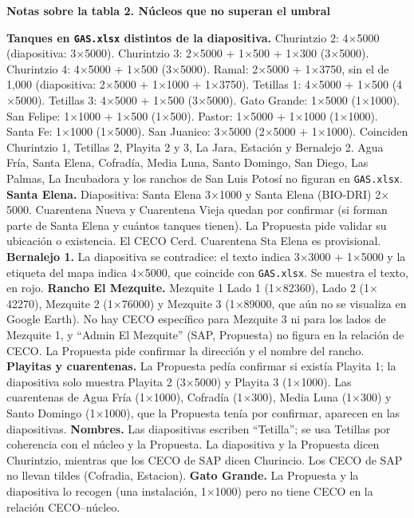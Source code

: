 \documentclass[10pt]{article}
\newcommand{\x}{$\times$}
\begin{document}
\clearpage
\thispagestyle{empty}
\textbf{Notas sobre la tabla 2. Núcleos que no superan el umbral}
\begin{lnotas}
 \textbf{Tanques en \texttt{GAS.xlsx} distintos de la diapositiva.} Churintzio 2: 4\x5000 (diapositiva: 3\x5000). Churintzio 3: 2\x5000 + 1\x500 + 1\x300 (3\x5000). Churintzio 4: 4\x5000 + 1\x500 (3\x5000). Ramal: 2\x5000 + 1\x3750, sin el de 1,000 (diapositiva: 2\x5000 + 1\x1000 + 1\x3750). Tetillas 1: 4\x5000 + 1\x500 (4\x5000). Tetillas 3: 4\x5000 + 1\x500 (3\x5000). Gato Grande: 1\x5000 (1\x1000). San Felipe: 1\x1000 + 1\x500 (1\x500). Pastor: 1\x5000 + 1\x1000 (1\x1000). Santa Fe: 1\x1000 (1\x5000). San Juanico: 3\x5000 (2\x5000 + 1\x1000). Coinciden Churintzio 1, Tetillas 2, Playita 2 y 3, La Jara, Estación y Bernalejo 2. Agua Fría, Santa Elena, Cofradía, Media Luna, Santo Domingo, San Diego, Las Palmas, La Incubadora y los ranchos de San Luis Potosí no figuran en \texttt{GAS.xlsx}.
 \textbf{Santa Elena.} Diapositiva: Santa Elena 3\x1000 y Santa Elena (BIO-DRI) 2\x5000. Cuarentena Nueva y Cuarentena Vieja quedan por confirmar (si forman parte de Santa Elena y cuántos tanques tienen). La Propuesta pide validar su ubicación o existencia. El CECO Cerd. Cuarentena Sta Elena es provisional.
 \textbf{Bernalejo 1.} La diapositiva se contradice: el texto indica 3\x3000 + 1\x5000 y la etiqueta del mapa indica 4\x5000, que coincide con \texttt{GAS.xlsx}. Se muestra el texto, en rojo.
 \textbf{Rancho El Mezquite.} Mezquite 1 Lado 1 (1\x82360), Lado 2 (1\x42270), Mezquite 2 (1\x76000) y Mezquite 3 (1\x89000, que aún no se visualiza en Google Earth). No hay CECO específico para Mezquite 3 ni para los lados de Mezquite 1, y ``Admin El Mezquite'' (SAP, Propuesta) no figura en la relación de CECO. La Propuesta pide confirmar la dirección y el nombre del rancho.
 \textbf{Playitas y cuarentenas.} La Propuesta pedía confirmar si existía Playita 1; la diapositiva solo muestra Playita 2 (3\x5000) y Playita 3 (1\x1000). Las cuarentenas de Agua Fría (1\x1000), Cofradía (1\x300), Media Luna (1\x300) y Santo Domingo (1\x1000), que la Propuesta tenía por confirmar, aparecen en las diapositivas.
 \textbf{Nombres.} Las diapositivas escriben ``Tetilla''; se usa Tetillas por coherencia con el núcleo y la Propuesta. La diapositiva y la Propuesta dicen Churintzio, mientras que los CECO de SAP dicen Churincio. Los CECO de SAP no llevan tildes (Cofradia, Estacion).
 \textbf{Gato Grande.} La Propuesta y la diapositiva lo recogen (una instalación, 1\x1000) pero no tiene CECO en la relación CECO--núcleo.

\end{lnotas}
\end{document}
